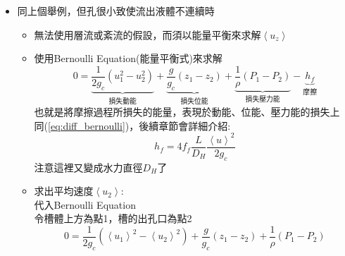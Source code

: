 \documentclass[../main.tex]{subfiles}
\begin{document}
\begin{itemize}
\begin{itemize}
\begin{equation}
          dt = -\frac{R^2}{R_0^2}\sqrt{\frac{2L f}{R_0 g}} \frac{1}{\sqrt{h+L}} dh
        \end{equation}
        積分
        \begin{equation}
          \int_0^{t} dt = -\frac{R^2}{R_0^2}\sqrt{\frac{2L f}{R_0 g}} \int_H^{h} \frac{1}{\sqrt{h+L}} dh
        \end{equation}
        得到
        \begin{equation}
          \boxed{t = \frac{2 R^2}{R_0}\sqrt{\frac{2 f}{g}} \left(\sqrt{H+L} - \sqrt{h+L}\right)}
        \end{equation}
      \item 最後，當$h=0$時，得到紊流下的Efflux time
        \begin{equation}
          \boxed{t_{\text{eff}} = \frac{2 R^2}{R_0}\sqrt{\frac{2 f}{g}} \left(\sqrt{H+L} - \sqrt{L}\right)}
        \end{equation}
    \end{itemize}
  \item 同上個舉例，但孔很小致使流出液體不連續時
    \begin{itemize}
      \item 無法使用層流或紊流的假設，而須以能量平衡來求解$\left<u_z\right>$
      \item 使用Bernoulli Equation(能量平衡式)來求解
      \begin{equation}
        0 = \underbrace{\frac{1}{2g_c}\left(u_1^2-u_2^2\right)}_{\text{損失動能}} 
        + \underbrace{\frac{g}{g_c}\left(z_1-z_2\right)}_{\text{損失位能}}
        + \underbrace{\frac{1}{\rho}\left(P_1-P_2\right)}_{\text{損失壓力能}}
        - \underbrace{h_f}_{\text{摩擦}}
      \end{equation}
      也就是將摩擦過程所損失的能量，表現於動能、位能、壓力能的損失上\\
      同(\ref{eq:diff_bernoulli})，後續章節會詳細介紹:
      \begin{equation}
        h_f = 4 f_f \frac{L}{D_H} \frac{\left<u\right>^2}{2g_c}
      \end{equation}
      注意這裡又變成水力直徑$D_H$了
      \item 求出平均速度$\left<u_2\right>$:\\
      代入Bernoulli Equation\\
      令槽體上方為點1，槽的出孔口為點2
      \begin{equation}
        0 = \frac{1}{2g_c}\left(\left<u_1\right>^2-\left<u_2\right>^2\right) 
        + \frac{g}{g_c}\left(z_1-z_2\right) 
        + \frac{1}{\rho}\left(P_1-P_2\right) 

\end{equation}
\end{itemize}
\end{itemize}
\end{document}
